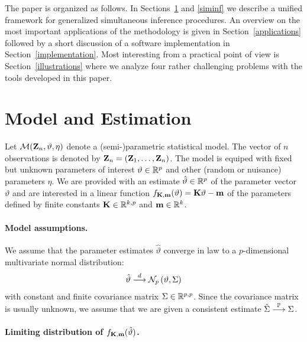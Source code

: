 \documentclass[12pt]{article}
\begin{document}
The paper is organized as follows. In Sections~\ref{model} and \ref{siminf} we
describe a unified framework for generalized simultaneous inference
procedures. An overview on the most important applications
of the methodology is given in Section~\ref{applications} followed
by a short discussion of a software implementation in Section~\ref{implementation}.
Most interesting from a practical point of view is 
Section~\ref{illustrations} where we analyze four rather challenging
problems with the tools developed in this paper.

\section{Model and Estimation} \label{model}

Let $\mathcal{M}(\mathbf{Z}_n, \vartheta, \eta)$ denote a (semi-)parametric statistical model.
The vector of $n$ observations is denoted by $\mathbf{Z}_n = (\mathbf{Z}_1, \dots, \mathbf{Z}_n)$. 
The model is equiped with fixed
but unknown parameters of interest $\vartheta \in \mathbb{R}^p$ 
and other (random or nuisance) parameters $\eta$. We are provided 
with an estimate $\hat{\vartheta} \in \mathbb{R}^p$ of the parameter 
vector $\vartheta$ and are interested in a linear
function $f_{\mathbf{K}, \mathbf{m}}(\vartheta) = \mathbf{K} \vartheta - \mathbf{m}$
of the parameters defined by finite constants $\mathbf{K} \in \mathbb{R}^{k, p}$
and $\mathbf{m} \in \mathbb{R}^k$.

\paragraph{Model assumptions.}

We assume that the parameter estimates $\hat{\vartheta}$ converge in law
to a $p$-dimensional multivariate normal distribution:
\begin{eqnarray} \label{normality}
\hat{\vartheta} \stackrel{d}{\longrightarrow} \mathcal{N}_p\left(\vartheta, \Sigma\right)
\end{eqnarray}
with constant and finite covariance matrix $\Sigma \in \mathbb{R}^{p,p}$.
Since the covariance matrix is usually unknown, we assume 
that we are given a consistent estimate $\hat{\Sigma} \stackrel{\mathbb{P}}{\longrightarrow} \Sigma$.

\paragraph{Limiting distribution of $f_{\mathbf{K},\mathbf{m}}(\hat{\vartheta})$.}
\end{document}
